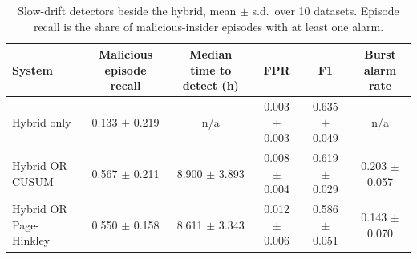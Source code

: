\begin{table}[t]
\centering
\scriptsize
\caption{Slow-drift detectors beside the hybrid, mean $\pm$ s.d.\ over 10 datasets. Episode recall is the share of malicious-insider episodes with at least one alarm.}
\label{tab:drift}
\begin{tabular}{lccccc}
\hline
System & Malicious episode recall & Median time to detect (h) & FPR & F1 & Burst alarm rate \\
\hline
Hybrid only & 0.133 $\pm$ 0.219 & n/a & 0.003 $\pm$ 0.003 & 0.635 $\pm$ 0.049 & n/a \\
Hybrid OR CUSUM & 0.567 $\pm$ 0.211 & 8.900 $\pm$ 3.893 & 0.008 $\pm$ 0.004 & 0.619 $\pm$ 0.029 & 0.203 $\pm$ 0.057 \\
Hybrid OR Page-Hinkley & 0.550 $\pm$ 0.158 & 8.611 $\pm$ 3.343 & 0.012 $\pm$ 0.006 & 0.586 $\pm$ 0.051 & 0.143 $\pm$ 0.070 \\
\hline
\end{tabular}
\end{table}
